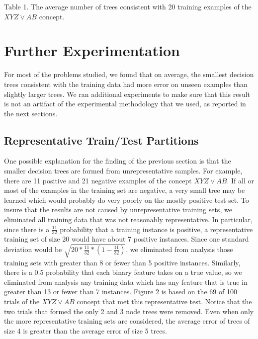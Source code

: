 \vspace{0.4cm}
\parindent 0.0cm
Table 1. The average number of trees consistent with 20 training examples 
of the $XYZ \vee AB$ concept.\\
\parindent 0.6cm

\vspace*{-0.5cm}
\section{Further Experimentation}

For most of the problems studied, we found that on average, the smallest
decision trees consistent with the training data had more error on
unseen examples than slightly larger trees.  We ran additional 
experiments to make sure that this result is not an artifact of the 
experimental methodology that we used, as reported in the next 
sections.

\subsection{Representative Train/Test Partitions}

One possible explanation for the finding of the previous section is
that the smaller decision trees are formed from unrepresentative
samples.  For example, there are 11 positive and 21 negative examples
of the concept $XYZ \vee AB$.  If all or most of the examples in the
training set are negative, a very small tree may be learned which
would probably do very poorly on the mostly positive test set.  To
insure that the results are not caused by unrepresentative
training sets, we eliminated all training data that was not reasonably
representative.  In particular, since there
is a $\frac{11}{32}$ probability that a training instance is positive,
a representative training set of size 20 would have about 7 positive
instances.  Since one standard deviation would be
$\sqrt{20*\frac{11}{32}*(1-\frac{11}{32})}$, we eliminated from
analysis those training sets with greater than 8 or fewer than 5
positive instances.  Similarly, there is a 0.5 probability that each
binary feature takes on a true value, so we eliminated from analysis
any training data which has any feature that is true in greater than
13 or fewer than 7 instances.  Figure 2 is based on the 69 of 100
trials of the $XYZ \vee AB$ concept that met this representative
test.  Notice that the two trials that formed the only 2 and 3 node
trees were removed.  Even when only the more representative training
sets are considered, the average error of trees of size 4 is greater
than the average error of size 5 trees.

